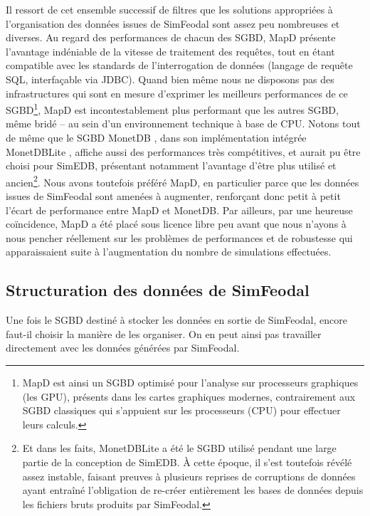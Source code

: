 			Il ressort de cet ensemble successif de filtres que les solutions appropriées à l'organisation des données issues de SimFeodal sont assez peu nombreuses et diverses.
			Au regard des performances de chacun des SGBD, MapD \autocite{root_mapd_2016} présente l'avantage indéniable de la vitesse de traitement des requêtes, tout en étant compatible avec les standards de l'interrogation de données (langage de requête SQL, interfaçable via JDBC).
			Quand bien même nous ne disposons pas des infrastructures qui sont en mesure d'exprimer les meilleurs performances de ce SGBD\footnote{
				MapD est ainsi un SGBD optimisé pour l'analyse sur processeurs graphiques (les GPU), présents dans les cartes graphiques modernes, contrairement aux SGBD classiques qui s'appuient sur les processeurs (CPU) pour effectuer leurs calculs.
			}, MapD est incontestablement plus performant que les autres SGBD, même \og bridé\fg{} -- au sein d'un environnement technique à base de CPU.
			Notons tout de même que le SGBD MonetDB \autocite{vermeij_monetdb_2008}, dans son implémentation intégrée MonetDBLite \autocite{raasveldt_monetdblite_2018}, affiche aussi des performances très compétitives, et aurait pu être choisi pour SimEDB, présentant notamment l'avantage d'être plus utilisé et ancien\footnote{
				Et dans les faits, MonetDBLite a été le SGBD utilisé pendant une large partie de la conception de SimEDB.
				À cette époque, il s'est toutefois révélé assez instable, faisant preuves à plusieurs reprises de corruptions de données ayant entraîné l'obligation de re-créer entièrement les bases de données depuis les fichiers bruts produits par SimFeodal.
			}.
		Nous avons toutefois préféré MapD, en particulier parce que les données issues de SimFeodal sont amenées à augmenter, renforçant donc petit à petit l'écart de performance entre MapD et MonetDB.
		Par ailleurs, par une heureuse coïncidence, MapD a été placé sous licence libre peu avant que nous n'ayons à nous pencher réellement sur les problèmes de performances et de robustesse qui apparaissaient suite à l'augmentation du nombre de simulations effectuées.
			

	\subsection{Structuration des données de SimFeodal}
	
	Une fois le SGBD destiné à stocker les données en sortie de SimFeodal, encore faut-il choisir la manière de les organiser.
	On en peut ainsi pas travailler directement avec les données générées par SimFeodal.

